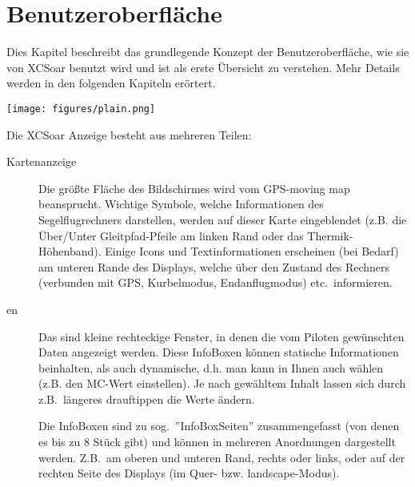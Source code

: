 \chapter{Benutzeroberfläche}\label{cha:interface}

Dies Kapitel beschreibt das grundlegende  Konzept der Benutzeroberfläche, wie sie von \textsf{XCSoar} benutzt wird und ist als erste Übersicht zu verstehen. Mehr Details werden in den folgenden Kapiteln erörtert.

\begin{center}
\texttt{[image: figures/plain.png]}
\end{center}

Die  \textsf{XCSoar} Anzeige besteht aus mehreren Teilen:
\begin{description}
\item[Kartenanzeige] Die größte Fläche des Bildschirmes wird vom GPS-moving map beansprucht.
Wichtige Symbole, welche Informationen des Segelflugrechners darstellen, werden auf dieser Karte
eingeblendet (z.B. die Über/Unter Gleitpfad-Pfeile am linken Rand oder das Thermik-Höhenband).
Einige Icons und Textinformationen  erscheinen  (bei Bedarf) am unteren Rande des Displays,
welche über den Zustand des Rechners (verbunden mit GPS, Kurbelmodus, Endanflugmodus) etc.\  informieren.
%
\item[{\InfoBox}en] Das sind kleine rechteckige Fenster, in denen die vom Piloten gewünschten Daten angezeigt werden. Diese InfoBoxen können statische Informationen beinhalten, als auch dynamische, d.h. man kann in Ihnen auch wählen (z.B. den MC-Wert einstellen). Je nach gewähltem Inhalt lassen sich durch z.B.\ längeres drauftippen die Werte ändern. 

Die InfoBoxen sind zu sog.\ ''InfoBoxSeiten'' zusammengefasst (von denen es bis zu 8 Stück  gibt)  und können in mehreren Anordnungen dargestellt werden. Z.B.\ am oberen und unteren Rand, rechts oder links, oder auf der rechten Seite des Displays (im Quer- bzw. landscape-Modus). 


\end{description}
